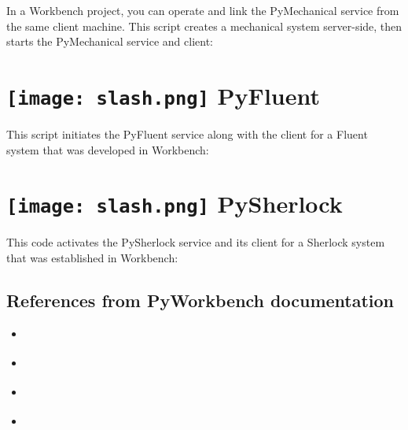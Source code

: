\documentclass[9pt,landscape]{article}
\begin{document}
\begin{multicols}{3}
In a Workbench project, you can operate and link the PyMechanical service from the same client machine. 
This script creates a mechanical system server-side, then starts the PyMechanical service and client:


\section{\texttt{[image: slash.png]} PyFluent}

This script initiates the PyFluent service along with the client for a Fluent system that was developed in Workbench:


\section{\texttt{[image: slash.png]} PySherlock}

This code activates the PySherlock service and its client for a Sherlock system that was established in Workbench:



\subsection{References from PyWorkbench documentation}
\begin{multicols}{2}
\begin{itemize}
    \item \href{https://workbench.docs.pyansys.com/version/stable/getting-started.html}{\color{blue}{Getting started}}
    \item \href{https://workbench.docs.pyansys.com/version/stable/user-guide.html}{\color{blue}{User guide}}
    \item \href{https://workbench.docs.pyansys.com/version/stable/examples.html}{\color{blue}{Examples}}
    \item \href{https://workbench.docs.pyansys.com/version/stable/api/index.html}{\color{blue}{API reference}}
\end{itemize}
\end{multicols}
\end{multicols}
\end{document}
